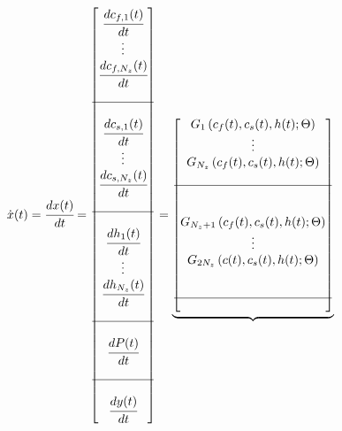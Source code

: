 \documentclass[../Article_Model_Parameters.tex]{subfiles}
\begin{document}
			{\footnotesize
				\begin{align*} \label{discretization}
					\dot{{\color{black}x}}(t) &= \cfrac{d {\color{black}x}(t)}{d t} = 
					\begin{bmatrix}
						\cfrac{d {\color{black}c_{f,1}}(t)}{d t} 	  \\
						\vdots					  \\
						\cfrac{d {\color{black}c_{f,N_z}}(t)}{d t} \\
						\\ \hline \\
						\cfrac{d {\color{black}c_{s,1}}(t)}{d t} 	  \\
						\vdots					  \\
						\cfrac{d {\color{black}c_{s,N_z}}(t)}{d t} \\
						\\ \hline \\
						\cfrac{d {\color{black}h_1}(t)}{d t} 	  \\
						\vdots 					  \\
						\cfrac{d {\color{black}h_{N_z}}(t)}{d t} \\
						\\ \hline \\
						\cfrac{d {\color{black}P}(t)}{d t} \\
						\\ \hline \\
						\cfrac{d {\color{black}y}(t)}{d t}
					\end{bmatrix}
					=
					\underbrace{\begin{bmatrix}
							{\color{black}G_1} \left( {\color{black}c_f}(t),{\color{black}c_s}(t),{\color{black}h}(t); {\color{black}\Theta} \right)\\ 
							\vdots\\ 
							{\color{black}G_{N_z}} \left( {\color{black}c_f}(t),{\color{black}c_s}(t),{\color{black}h}(t); {\color{black}\Theta} \right)\\ 
							\\ \hline \\ \\
							{\color{black}G_{N_z+1}} \left( {\color{black}c_f}(t),{\color{black}c_s}(t),{\color{black}h}(t); {\color{black}\Theta} \right)\\ 
							\vdots\\
							{\color{black}G_{2N_z}} \left( {\color{black}c}(t),{\color{black}c_s}(t),{\color{black}h}(t); {\color{black}\Theta} \right)\\ 
							\\ \\ \hline \\ 

\end{bmatrix}}
\end{align*}}
\end{document}
